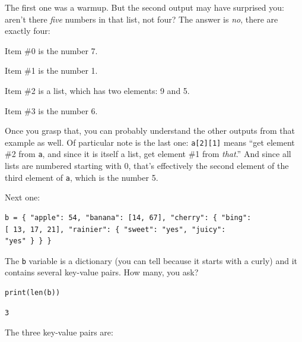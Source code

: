The first one was a warmup. But the second output may have surprised you:
aren't there \textit{five} numbers in that list, not four? The answer is
\textit{no}, there are exactly four:

\begin{compactitem}
\item Item \#0 is the number 7.
\item Item \#1 is the number 1.
\item Item \#2 is a list, which has two elements: 9 and 5.
\item Item \#3 is the number 6.
\end{compactitem}

Once you grasp that, you can probably understand the other outputs from that
example as well. Of particular note is the last one: \texttt{a[2][1]} means
``get element \#2 from \texttt{a}, and since it is itself a list, get element
\#1 from \textit{that}.'' And since all lists are numbered starting with 0,
that's effectively the second element of the third element of \texttt{a}, which
is the number 5.

Next one:


\begin{Verbatim}[fontsize=\small,samepage=true,frame=leftline,framesep=5mm,framerule=1mm]
b = { "apple": 54, "banana": [14, 67], "cherry": { "bing":
[ 13, 17, 21], "rainier": { "sweet": "yes", "juicy":
"yes" } } }
\end{Verbatim}


The \texttt{b} variable is a dictionary (you can tell because it starts with a
curly) and it contains several key-value pairs. How many, you ask?

\begin{Verbatim}[fontsize=\small,samepage=true,frame=single,framesep=3mm]
print(len(b))
\end{Verbatim}
\vspace{-.2in}

\begin{Verbatim}[fontsize=\small,samepage=true,frame=leftline,framesep=5mm,framerule=1mm]
3
\end{Verbatim}

The three key-value pairs are:


